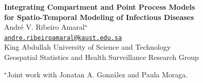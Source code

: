 \documentclass[12pt, aspectratio = 169]{beamer} %
\author{André Victor Ribeiro Amaral \\ \href{mailto:andre.ribeiroamaral@kaust.edu.sa}{andre.ribeiroamaral@kaust.edu.sa}}
\begin{document}
	\AtBeginSection{}
	
	
	{

		\begin{frame}[t]
			\centering
			\vspace{42pt}
			\textbf{{\large {} Integrating Compartment and Point Process Models \\ for\hspace{1pt} Spatio-Temporal Modeling of Infectious\hspace{1pt} Diseases}} \\
			\vspace{18pt}
			{\normalsize André V.\hspace{-1pt} Ribeiro\hspace{-1pt} Amaral\hspace{1pt}${}^{\star}$}\\
			{\scriptsize\texttt{\href{mailto:andre.ribeiroamaral@kaust.edu.sa}{andre.ribeiroamaral@kaust.edu.sa}}} \\
			\vspace{18pt}
			{\small King Abdullah University of Science and Technology}\\
			{\small Geospatial Statistics and Health Surveillance Research Group} \\
			\vspace{10pt}
			\begin{flushleft} {${}^{\star}$\hspace{1pt}\scriptsize Joint work with Jonatan A. González and Paula Moraga.}\end{flushleft}
		\end{frame}
	}
\end{document}
